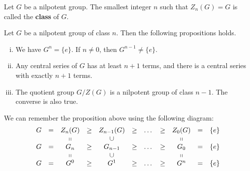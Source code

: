 \begin{definition}
	Let $G$ be a nilpotent group. The smallest integer $n$ such that $Z_n(G) = G$ is called the \textbf{class} of $G$.
\end{definition}

 
\begin{proposition} \label{prop-nilpotent-class}
	Let $G$ be a nilpotent group of class $n$. Then the following propositions holds.
	\begin{enumerate}[(i)]
		\item We have $G^n = \{e\}$. If $n \neq 0$, then $G^{n-1} \neq \{e\}$.
		\item Any central series of $G$ has at least $n+1$ terms, and there is a central series with exactly $n+1$ terms.
		\item The quotient group $G/Z(G)$ is a nilpotent group of class $n-1$. The converse is also true.
	\end{enumerate}
\end{proposition}
\begin{remark}
	We can remember the proposition above  using the following diagram:
	\begin{equation*}
		\begin{array}{ccccccccccc}
			G&=&Z_n(G) & \geq & Z_{n-1}(G) & \geq & \dots & \geq & Z_0(G) &=& \{e\} \\
			&&\shortparallel & & \cup & & & & \shortparallel&&\\
			G &= &G_n & \geq & G_{n-1} & \geq & \dots & \geq & G_0 &=& \{e\} \\
			&&\shortparallel & & \cup & & & & \shortparallel &&\\
			G &= &G^0 & \geq & G^1 & \geq & \dots & \geq & G^n &=& \{e\}
		\end{array}
	\end{equation*}
\end{remark}

